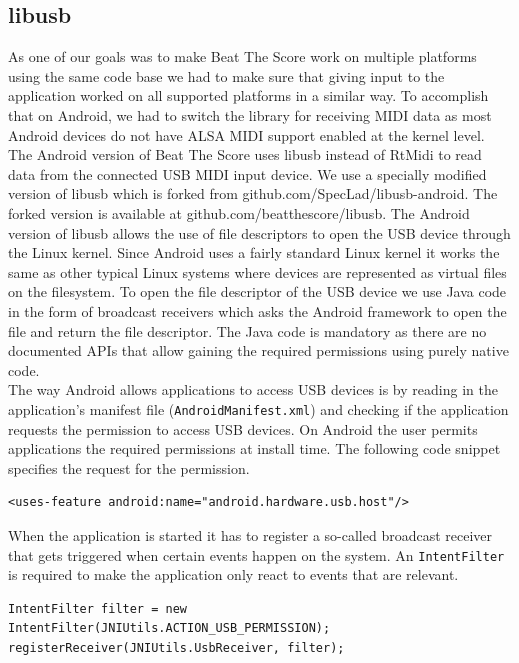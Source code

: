 \subsection{libusb}
As one of our goals was to make Beat The Score work on multiple platforms using the same code base we had to make sure that giving input to the application worked on all supported platforms in a similar way. To accomplish that on Android, we had to switch the library for receiving MIDI data as most Android devices do not have ALSA MIDI support enabled at the kernel level.
\\
The Android version of Beat The Score uses libusb instead of RtMidi to read data from the connected USB MIDI input device. We use a specially modified version of libusb which is forked from github.com/SpecLad/libusb-android. The forked version is available at github.com/beatthescore/libusb. The Android version of libusb allows the use of file descriptors to open the USB device through the Linux kernel. Since Android uses a fairly standard Linux kernel it works the same as other typical Linux systems where devices are represented as virtual files on the filesystem. To open the file descriptor of the USB device we use Java code in the form of broadcast receivers which asks the Android framework to open the file and return the file descriptor. The Java code is mandatory as there are no documented APIs that allow gaining the required permissions using purely native code.
\\
The way Android allows applications to access USB devices is by reading in the application's manifest file ({\tt AndroidManifest.xml}) and checking if the application requests the permission to access USB devices. On Android the user permits applications the required permissions at install time. The following code snippet specifies the request for the permission.
\begin{lstlisting}
<uses-feature android:name="android.hardware.usb.host"/>
\end{lstlisting}

When the application is started it has to register a so-called broadcast receiver that gets triggered when certain events happen on the system. An {\tt IntentFilter} is required to make the application only react to events that are relevant.
\begin{lstlisting}
IntentFilter filter = new IntentFilter(JNIUtils.ACTION_USB_PERMISSION);
registerReceiver(JNIUtils.UsbReceiver, filter);
\end{lstlisting}


